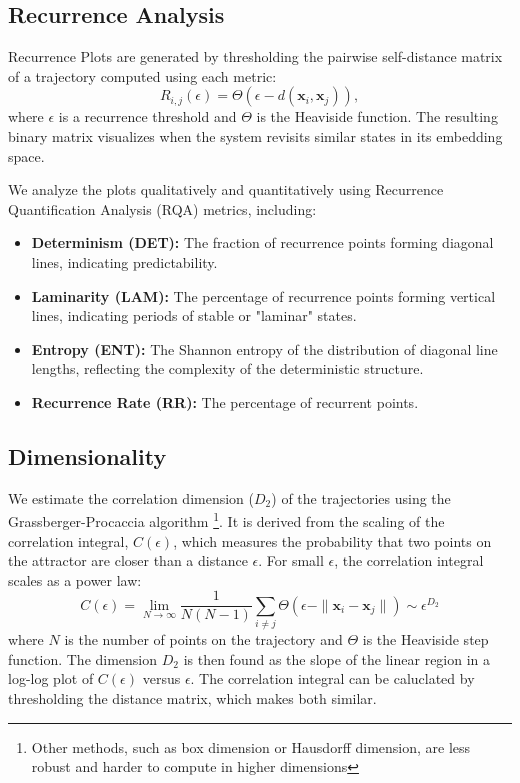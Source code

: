 \documentclass[a4paper,12pt]{article}
\begin{document}
\subsection{Recurrence Analysis}
\label{subsec:recurrence_analysis_methods}

Recurrence Plots are generated by thresholding the pairwise self-distance matrix of a trajectory computed using each metric:
\begin{equation}
    R_{i,j}(\epsilon) = \Theta(\epsilon - d(\mathbf{x}_i, \mathbf{x}_j)),
\end{equation}
where $\epsilon$ is a recurrence threshold and $\Theta$ is the Heaviside function. The resulting binary matrix visualizes when the system revisits similar states in its embedding space.

We analyze the plots qualitatively and quantitatively using Recurrence Quantification Analysis (RQA) metrics, including:
\begin{itemize}
    \item \textbf{Determinism (DET):} The fraction of recurrence points forming diagonal lines, indicating predictability.
    \item \textbf{Laminarity (LAM):} The percentage of recurrence points forming vertical lines, indicating periods of stable or "laminar" states.
    \item \textbf{Entropy (ENT):} The Shannon entropy of the distribution of diagonal line lengths, reflecting the complexity of the deterministic structure.
    \item \textbf{Recurrence Rate (RR):} The percentage of recurrent points.

\end{itemize} %


\subsection{Dimensionality}
\label{subsec:dimensionality_methods}
We estimate the correlation dimension ($D_2$) of the trajectories using the Grassberger-Procaccia algorithm \cite{GRASSBERGER1983189} \footnote{Other methods, such as box dimension or Hausdorff dimension, are less robust and harder to compute in higher dimensions}. It is derived from the scaling of the correlation integral, $C(\epsilon)$, which measures the probability that two points on the attractor are closer than a distance $\epsilon$. For small $\epsilon$, the correlation integral scales as a power law:
\begin{equation}
    C(\epsilon) = \lim_{N \to \infty} \frac{1}{N(N-1)} \sum_{i \ne j} \Theta(\epsilon - \|\mathbf{x}_i - \mathbf{x}_j\|) \sim \epsilon^{D_2}
\end{equation}
where $N$ is the number of points on the trajectory and $\Theta$ is the Heaviside step function. The dimension $D_2$ is then found as the slope of the linear region in a log-log plot of $C(\epsilon)$ versus $\epsilon$. The correlation integral can be caluclated by thresholding the distance matrix, which makes both similar.
\end{document}
